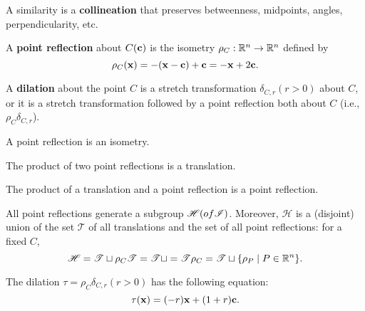 \begin{corollary}
    A similarity is a \textbf{collineation} that preserves betweenness, midpoints, angles, perpendicularity, etc.
\end{corollary}

\begin{definition}
    \begin{statements}{}
        \item A \textbf{point reflection} about \(C(\mathbf{c})\) is the isometry \(\rho_C : \mathbb{R}^n \to \mathbb{R}^n\) defined by
        \[\rho_C(\mathbf{x}) = -(\mathbf{x} - \mathbf{c}) + \mathbf{c} = -\mathbf{x} + 2\mathbf{c}.\]
        \item A \textbf{dilation} about the point \(C\) is a stretch transformation \(\delta_{C ,r} (r > 0)\) about \(C\), or it is a stretch transformation followed by a point reflection both about \(C\) (i.e., \(\rho_C \delta_{C ,r}\)).
    \end{statements}
\end{definition}

\begin{lemma}
    \begin{statements}{}
        \item A point reflection is an isometry.
        \item The product of two point reflections is a translation.
        \item The product of a translation and a point reflection is a point reflection.
    \end{statements}
\end{lemma}

\begin{proposition}
    All point reflections generate a subgroup \(\mathscr{H} (of \mathscr{I})\). Moreover, \(\mathscr{H}\) is a (disjoint) union of the set \(\mathscr{T}\) of all translations and the set of all point reflections: for a fixed \(C\),
    \[\mathscr{H} = \mathscr{T} \sqcup \rho_C \mathscr{T} = \mathscr{T} \sqcup = \mathscr{T} \rho_C = \mathscr{T} \sqcup \{\rho_P \mid P \in \mathbb{R}^n\}.\]
\end{proposition}


\begin{proposition}
    The dilation \(\tau = \rho_C \delta_{C, r} (r > 0)\) has the following equation:
    \[\tau(\mathbf{x}) = (-r)\mathbf{x} + (1 + r)\mathbf{c}.\]
\end{proposition}

